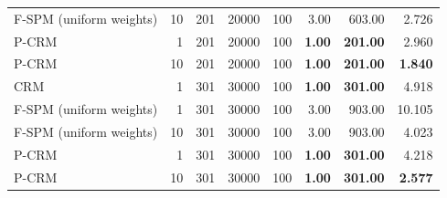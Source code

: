 \begin{tabular}{lrrrrrrr}
F-SPM (uniform weights) & 10 & 201 & 20000 & 100 & 3.00 & 603.00 & 2.726 \\
P-CRM & 1 & 201 & 20000 & 100 & \textbf{1.00} & \textbf{201.00} & 2.960 \\
P-CRM & 10 & 201 & 20000 & 100 & \textbf{1.00} & \textbf{201.00} & \textbf{1.840} \\
\midrule
CRM & 1 & 301 & 30000 & 100 & \textbf{1.00} & \textbf{301.00} & 4.918 \\
F-SPM (uniform weights) & 1 & 301 & 30000 & 100 & 3.00 & 903.00 & 10.105 \\
F-SPM (uniform weights) & 10 & 301 & 30000 & 100 & 3.00 & 903.00 & 4.023 \\
P-CRM & 1 & 301 & 30000 & 100 & \textbf{1.00} & \textbf{301.00} & 4.218 \\
P-CRM & 10 & 301 & 30000 & 100 & \textbf{1.00} & \textbf{301.00} & \textbf{2.577} \\
\bottomrule
\end{tabular}
